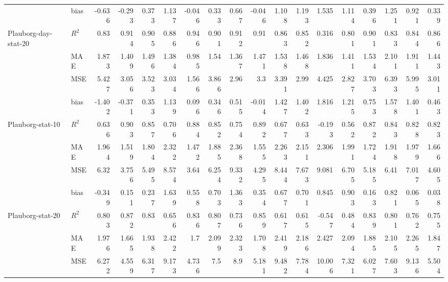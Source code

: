 \begin{tabular}{p{1.5cm}lrrrrrrrrrrrrrrrr}
                        & bias  & -0.636 & -0.293 &  0.373 &  1.137 & -0.046 &  0.333 &  0.667 & -0.046 &  1.108 &  1.193 &  1.535 &  1.114 &  0.396 &  1.251 &  0.921 &  0.339 \\
 Plauborg-day-stat-20   & $R^2$ &  0.83  &  0.914 &  0.905 &  0.886 &  0.946 &  0.901 &  0.912 &  0.91  &  0.863 &  0.852 &  0.316 &  0.801 &  0.901 &  0.833 &  0.844 &  0.866 \\
                        & MAE   &  1.873 &  1.409 &  1.496 &  1.384 &  0.985 &  1.54  &  1.367 &  1.471 &  1.538 &  1.468 &  1.836 &  1.411 &  1.534 &  2.101 &  1.911 &  1.443 \\
                        & MSE   &  5.427 &  3.056 &  3.523 &  3.034 &  1.566 &  3.866 &  2.96  &  3.3   &  3.391 &  2.99  &  4.425 &  2.827 &  3.703 &  6.393 &  5.995 &  3.011 \\
                        & bias  & -1.402 & -0.371 &  0.353 &  1.139 &  0.096 &  0.346 &  0.515 & -0.014 &  1.427 &  1.402 &  1.816 &  1.215 &  0.753 &  1.578 &  1.401 &  0.463 \\
 Plauborg-stat-10       & $R^2$ &  0.636 &  0.903 &  0.857 &  0.706 &  0.884 &  0.852 &  0.754 &  0.892 &  0.677 &  0.633 & -0.193 &  0.562 &  0.872 &  0.843 &  0.828 &  0.823 \\
                        & MAE   &  1.964 &  1.519 &  1.804 &  2.322 &  1.472 &  1.885 &  2.368 &  1.555 &  2.263 &  2.151 &  2.306 &  1.991 &  1.724 &  1.918 &  1.979 &  1.666 \\
                        & MSE   &  6.32  &  3.756 &  5.495 &  8.574 &  3.64  &  6.254 &  9.332 &  4.295 &  8.444 &  7.673 &  9.081 &  6.705 &  5.185 &  6.41  &  7.017 &  4.605 \\
                        & bias  & -0.349 &  0.151 &  0.237 &  1.639 &  0.558 &  0.703 &  1.363 &  0.354 &  0.677 &  0.701 &  0.845 &  0.903 &  0.163 &  0.821 &  0.065 &  0.038 \\
 Plauborg-stat-20       & $R^2$ &  0.803 &  0.872 &  0.83  &  0.656 &  0.836 &  0.807 &  0.736 &  0.859 &  0.617 &  0.615 & -0.547 &  0.484 &  0.839 &  0.801 &  0.762 &  0.755 \\
                        & MAE   &  1.976 &  1.665 &  1.938 &  2.422 &  1.7   &  2.099 &  2.323 &  1.708 &  2.419 &  2.186 &  2.427 &  2.094 &  1.885 &  2.105 &  2.265 &  1.847 \\
                        & MSE   &  6.272 &  4.559 &  6.317 &  9.173 &  4.736 &  7.5   &  8.9   &  5.181 &  9.482 &  7.784 & 10.006 &  7.321 &  6.027 &  7.603 &  9.136 &  5.504 \\

\end{tabular}
